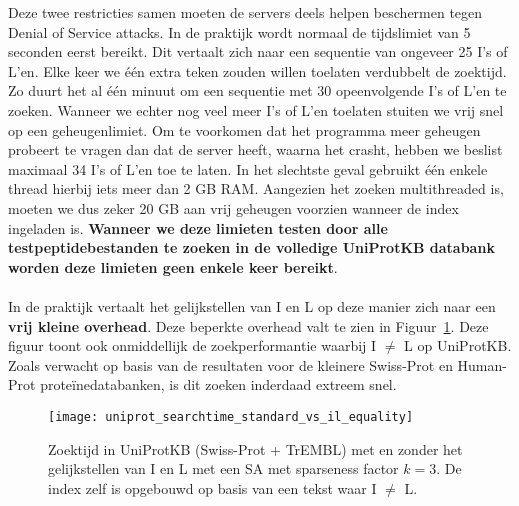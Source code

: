 Deze twee restricties samen moeten de servers deels helpen beschermen tegen Denial of Service attacks.
In de praktijk wordt normaal de tijdslimiet van 5 seconden eerst bereikt.
Dit vertaalt zich naar een sequentie van ongeveer 25 I's of L'en.
Elke keer we één extra teken zouden willen toelaten verdubbelt de zoektijd.
Zo duurt het al één minuut om een sequentie met 30 opeenvolgende I's of L'en te zoeken.
Wanneer we echter nog veel meer I's of L'en toelaten stuiten we vrij snel op een geheugenlimiet.
Om te voorkomen dat het programma meer geheugen probeert te vragen dan dat de server heeft, waarna het crasht, hebben we beslist maximaal 34 I's of L'en toe te laten.
In het slechtste geval gebruikt één enkele thread hierbij iets meer dan 2 GB RAM\@.
Aangezien het zoeken multithreaded is, moeten we dus zeker 20 GB aan vrij geheugen voorzien wanneer de index ingeladen is.
\textbf{Wanneer we deze limieten testen door alle testpeptidebestanden te zoeken in de volledige UniProtKB databank worden deze limieten geen enkele keer bereikt}.
\\ \\
In de praktijk vertaalt het gelijkstellen van I en L op deze manier zich naar een \textbf{vrij kleine overhead}.
Deze beperkte overhead valt te zien in Figuur~\ref{fig:uniprot_search}.
Deze figuur toont ook onmiddellijk de zoekperformantie waarbij I $\neq$ L op UniProtKB\@.
Zoals verwacht op basis van de resultaten voor de kleinere Swiss-Prot en Human-Prot proteïnedatabanken, is dit zoeken inderdaad extreem snel.

\begin{figure}[ht]
    \centering
    \texttt{[image: uniprot\_searchtime\_standard\_vs\_il\_equality]}
    \caption{Zoektijd in UniProtKB (Swiss-Prot + TrEMBL) met en zonder het gelijkstellen van I en L met een SA met sparseness factor $k = 3$. De index zelf is opgebouwd op basis van een tekst waar I $\neq$ L.}
    \label{fig:uniprot_search}
\end{figure}

